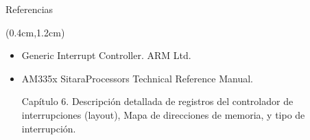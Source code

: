 \documentclass[usenames,table,xcolor={x11names},aspectratio=169]{beamer}
\begin{document}
\begin{frame}[t]{Referencias}
 \begin{textblock*}{\textwidth}(0.4cm,1.2cm)
  \begin{itemize}[<+(1)->] \justifying
   \item Generic Interrupt Controller. ARM Ltd. 
   
   \href{https://documentation-service.arm.com/static/5f8ff21df86e16515cdbfafe?token=}{\color{blue}{\footnotesize https://documentation-service.arm.com/static/5f8ff21df86e16515cdbfafe?token=}}
   
   \item AM335x Sitara\texttrademark Processors Technical Reference Manual.
   
    \href{https://www.ti.com/lit/ug/spruh73q/spruh73q.pdf}{\color{blue}{\footnotesize https://www.ti.com/lit/ug/spruh73q/spruh73q.pdf}}
    
    Capítulo 6. Descripción detallada de registros del controlador de interrupciones (layout), Mapa de direcciones de memoria, y tipo de interrupción.
  \end{itemize}\
 \end{textblock*}
\end{frame}
\end{document}
